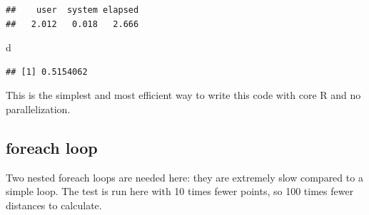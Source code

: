 \documentclass[
  12pt,
  american,
  a4paper,
  extrafontsizes,onecolumn,openright
  ]{memoir}
\newenvironment{Shaded}{\begin{snugshade}}{\end{snugshade}}
\newcommand{\AttributeTok}[1]{\textcolor[rgb]{0.77,0.63,0.00}{#1}}
\newcommand{\ControlFlowTok}[1]{\textcolor[rgb]{0.13,0.29,0.53}{\textbf{#1}}}
\newcommand{\DecValTok}[1]{\textcolor[rgb]{0.00,0.00,0.81}{#1}}
\newcommand{\FunctionTok}[1]{\textcolor[rgb]{0.00,0.00,0.00}{#1}}
\newcommand{\NormalTok}[1]{#1}
\newcommand{\OtherTok}[1]{\textcolor[rgb]{0.56,0.35,0.01}{#1}}
\newcommand{\SpecialCharTok}[1]{\textcolor[rgb]{0.00,0.00,0.00}{#1}}
\newcommand{\StringTok}[1]{\textcolor[rgb]{0.31,0.60,0.02}{#1}}
\begin{document}
\begin{verbatim}
##    user  system elapsed 
##   2.012   0.018   2.666
\end{verbatim}

\begin{Shaded}
\begin{Highlighting}[]
\NormalTok{d}
\end{Highlighting}
\end{Shaded}

\begin{verbatim}
## [1] 0.5154062
\end{verbatim}

\normalsize

This is the simplest and most efficient way to write this code with core R and no parallelization.

\hypertarget{foreach-loop}{%
\subsection{foreach loop}\label{foreach-loop}}

Two nested foreach loops are needed here: they are extremely slow compared to a simple loop.
The test is run here with 10 times fewer points, so 100 times fewer distances to calculate.

\scriptsize

\begin{Shaded}
\end{Shaded}
\end{document}

